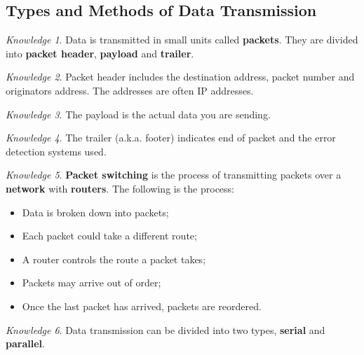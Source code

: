 \documentclass[8pt]{article}
\theoremstyle{remark}
\newtheorem{knowledge}{Knowledge}[subsection]
\begin{document}
        \subsection{Types and Methods of Data Transmission}    

        \begin{knowledge}
            Data is transmitted in small units called \textbf{packets}. They are divided into \textbf{packet header}, \textbf{payload} and \textbf{trailer}.
        \end{knowledge}
        
        \begin{knowledge}
            Packet header includes the destination address, packet number and originators address. The addresses are often IP addresses.
        \end{knowledge}

        \begin{knowledge}
            The payload is the actual data you are sending.
        \end{knowledge}

        \begin{knowledge}
            The trailer (a.k.a. footer) indicates end of packet and the error detection systems used.
        \end{knowledge}

        \begin{knowledge}
            \textbf{Packet switching} is the process of transmitting packets over a \textbf{network} with \textbf{routers}. The following is the process:
            \begin{itemize}
                \item Data is broken down into packets;
                \item Each packet could take a different route;
                \item A router controls the route a packet takes;
                \item Packets may arrive out of order;
                \item Once the last packet has arrived, packets are reordered.
            \end{itemize}
        \end{knowledge}

        \begin{knowledge}
            Data transmission can be divided into two types, \textbf{serial} and \textbf{parallel}.
        \end{knowledge}
\end{document}
